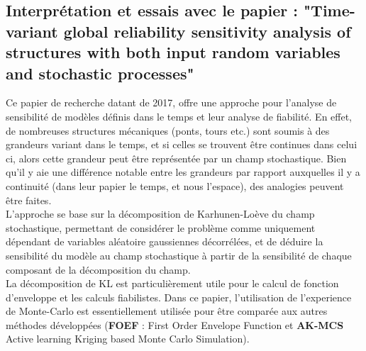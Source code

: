 \documentclass[a4paper,10pt]{article}
\begin{document}



\subsection{Interprétation et essais avec le papier : "Time-variant global reliability sensitivity analysis of structures with both input random variables and stochastic processes"}
Ce papier de recherche datant de 2017, offre une approche pour l'analyse de sensibilité de modèles définis dans le temps et leur analyse de fiabilité. En effet, de nombreuses structures mécaniques (ponts, tours etc.) sont soumis à des grandeurs variant dans le temps, et si celles se trouvent être continues dans celui ci, alors cette grandeur peut être représentée par un champ stochastique. Bien qu'il y aie une différence notable entre les grandeurs par rapport auxquelles il y a continuité (dans leur papier le temps, et nous l'espace), des analogies peuvent être faites. \\

L'approche se base sur la décomposition de Karhunen-Loève du champ stochastique, permettant de considérer le problème comme uniquement dépendant de variables aléatoire gaussiennes décorrélées, et de déduire la sensibilité du modèle au champ stochastique à partir de la sensibilité de chaque composant de la décomposition du champ. \\ 

La décomposition de KL est particulièrement utile pour le calcul de fonction d'enveloppe et les calculs fiabilistes. Dans ce papier, l'utilisation de l'experience de Monte-Carlo est essentiellement utilisée pour être comparée aux autres méthodes développées (\textbf{FOEF} : First Order Envelope Function et \textbf{AK-MCS} Active learning Kriging based Monte Carlo Simulation).\\
\end{document}
